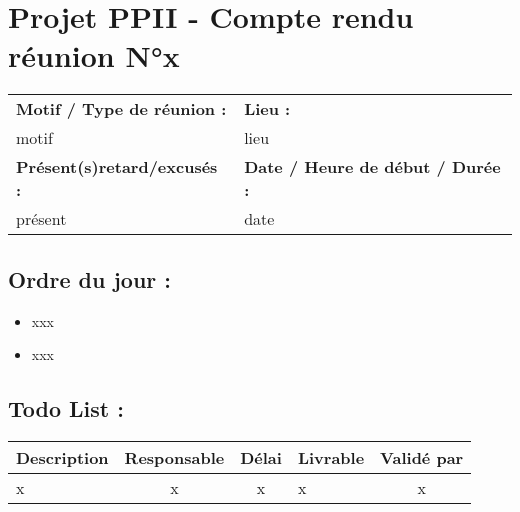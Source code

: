 \documentclass{article}
\begin{document}
\section*{Projet PPII - Compte rendu réunion N°x}
\begin{tabular}{|p{7cm}|p{6cm}|}
    \hline
    \textbf{Motif / Type de réunion :}
    & \textbf{Lieu :}
    \\
    motif 
    & 
    lieu
    \\ \hline
    \textbf{Présent(s)retard/excusés :}
    &
    \textbf{Date / Heure de début / Durée :}
    \\ 
    présent
    &
    date
    \\ \hline
\end{tabular}

\subsection*{Ordre du jour :}
\begin{itemize}
    \item{xxx}
    \item{xxx}
\end{itemize}

\subsection*{Todo List :}
\begin{tabular}{|p{3.5cm}|c|c|p{4.5cm}|c|}
    \hline 
    Description & Responsable & Délai & Livrable & Validé par 
    \\ \hline
    x & x & x & x & x
    \\ \hline
\end{tabular}
\end{document}
